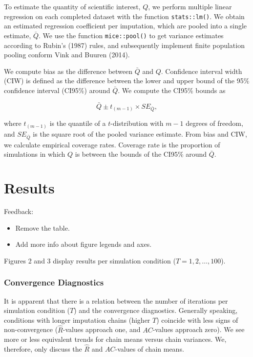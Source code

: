 \documentclass[
  Royal, times, sageapa]{sagej}
\begin{document}
To estimate the quantity of scientific interest, \(Q\), we perform
multiple linear regression on each completed dataset with the function
\texttt{stats::lm()}. We obtain an estimated regression coefficient per
imputation, which are pooled into a single estimate, \(\bar{Q}\). We use
the function \texttt{mice::pool()} to get variance estimates according
to Rubin's (1987) rules, and subsequently implement finite population
pooling conform Vink and Buuren (2014).

We compute bias as the difference between \(\bar{Q}\) and \(Q\).
Confidence interval width (CIW) is defined as the difference between the
lower and upper bound of the 95\% confidence interval (CI95\%) around
\(\bar{Q}\). We compute the CI95\% bounds as

\[\bar{Q} \pm t_{(m-1)} \times SE_{\bar{Q}},\]

where \(t_{(m-1)}\) is the quantile of a \(t\)-distribution with \(m-1\)
degrees of freedom, and \(SE_{\bar{Q}}\) is the square root of the
pooled variance estimate. From bias and CIW, we calculate empirical
coverage rates. Coverage rate is the proportion of simulations in which
\(Q\) is between the bounds of the CI95\% around \(\bar{Q}\).

\hypertarget{results}{%
\section{Results}\label{results}}

Feedback:

\begin{itemize}
\item
  Remove the table.
\item
  Add more info about figure legends and axes.
\end{itemize}

Figures 2 and 3 display results per simulation condition
(\(T = 1,2,\dots,100\)).

\hypertarget{convergence-diagnostics}{%
\subsubsection{Convergence Diagnostics}\label{convergence-diagnostics}}

It is apparent that there is a relation between the number of iterations
per simulation condition (\(T\)) and the convergence diagnostics.
Generally speaking, conditions with longer imputation chains (higher
\(T\)) coincide with less signs of non-convergence
(\(\widehat{R}\)-values approach one, and \(AC\)-values approach zero).
We see more or less equivalent trends for chain means versus chain
variances. We, therefore, only discuss the \(\widehat{R}\) and
\(AC\)-values of chain means.
\end{document}
